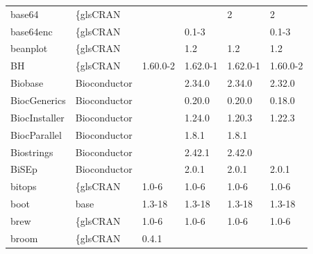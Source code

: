 \begin{longtable}{llllll}
\rowcolor{black!5}
base64                        & \{gls{CRAN}                      &             &             & 2              & 2                  \\
\rowcolor{black!10}
base64enc                     & \{gls{CRAN}                      &             & 0.1-3       &                & 0.1-3             \\
\rowcolor{black!5}
beanplot                      & \{gls{CRAN}                      &             & 1.2         & 1.2            & 1.2                \\
\rowcolor{black!10}
BH                            & \{gls{CRAN}                      & 1.60.0-2    & 1.62.0-1    & 1.62.0-1       & 1.60.0-2          \\
\rowcolor{black!5}
Biobase                       & Bioconductor              &             & 2.34.0      & 2.34.0         & 2.32.0             \\
\rowcolor{black!10}
BiocGenerics                  & Bioconductor              &             & 0.20.0      & 0.20.0         & 0.18.0            \\
\rowcolor{black!5}
BiocInstaller                 & Bioconductor              &             & 1.24.0      & 1.20.3         & 1.22.3             \\
\rowcolor{black!10}
BiocParallel                  & Bioconductor              &             & 1.8.1       & 1.8.1          &                   \\
\rowcolor{black!5}
Biostrings                    & Bioconductor              &             & 2.42.1      & 2.42.0         &                    \\
\rowcolor{black!10}
BiSEp                         & Bioconductor              &             & 2.0.1       & 2.0.1          & 2.0.1             \\
\rowcolor{black!5}
bitops                        & \{gls{CRAN}                      & 1.0-6       & 1.0-6       & 1.0-6          & 1.0-6              \\
\rowcolor{black!10}
boot                          & base                      & 1.3-18      & 1.3-18      & 1.3-18         & 1.3-18            \\
\rowcolor{black!5}
brew                          & \{gls{CRAN}                      & 1.0-6       & 1.0-6       & 1.0-6          & 1.0-6              \\
\rowcolor{black!10}
broom                         & \{gls{CRAN}                      & 0.4.1       &             &                &                   \\

\end{longtable}
